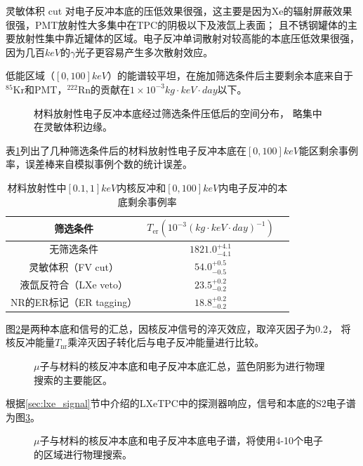 灵敏体积 cut 对电子反冲本底的压低效果很强，这主要是因为$\mathrm{Xe}$的辐射屏蔽效果很强，PMT放射性大多集中在TPC的阴极以下及液氙上表面；
且不锈钢罐体的主要放射性集中靠近罐体的区域。电子反冲单词散射对较高能的本底压低效果很强，因为几百$\si{keV}$的$\gamma$光子更容易产生多次散射效应。

低能区域（$[0, 100]\si{keV}$）的能谱较平坦，在施加筛选条件后主要剩余本底来自于${}^{85}\mathrm{Kr}$和PMT，${}^{222}\mathrm{Rn}$的贡献在$1\times10^{-3}\si{kg}\cdot\si{keV}\cdot\si{day}$以下。

\begin{figure}
  \centering
  
  \caption{\label{fig:material_er_xyzr} 材料放射性电子反冲本底经过筛选条件压低后的空间分布，
  略集中在灵敏体积边缘。}
\end{figure}

表\ref{tab:cuts_material_remain}列出了几种筛选条件后的材料放射性电子反冲本底在$[0,100]\si{keV}$能区剩余事例率，误差棒来自模拟事例个数的统计误差。

\begin{table}
  \centering
  \caption{材料放射性中$[0.1,1]\si{keV}$内核反冲和$[0,100]\si{keV}$内电子反冲的本底剩余事例率}
  \begin{tabular}{ccc}
    \toprule
    筛选条件 & $T_\mathrm{er}\left(10^{-3}\left(\si{kg}\cdot\si{keV}\cdot\si{day}\right)^{-1}\right)$ \\
    \midrule
    无筛选条件 & $1821.0_{-4.1}^{+4.1}$ \\
    灵敏体积（FV cut） & $54.0_{-0.5}^{+0.5}$ \\
    液氙反符合（LXe veto） & $23.5_{-0.2}^{+0.2}$ \\
    NR的ER标记（ER tagging） & $18.8_{-0.2}^{+0.2}$ \\
    \bottomrule
  \end{tabular}
  \label{tab:cuts_material_remain}
\end{table}

图\ref{fig:all_event_rate}是两种本底和信号的汇总，因核反冲信号的淬灭效应，取淬灭因子为0.2，
将核反冲能量$T_\mathrm{nr}$乘淬灭因子转化后与电子反冲能量进行比较。

\begin{figure}
  \centering
  
  \caption{\label{fig:all_event_rate} $\mu$子与材料的核反冲本底和电子反冲本底汇总，蓝色阴影为进行物理搜索的主要能区。}
\end{figure}

根据\ref{sec:lxe_signal}节中介绍的LXeTPC中的探测器响应，信号和本底的$\mathrm{S2}$电子谱为图\ref{fig:S2e_rate_bkg}。

\begin{figure}
  \centering
  
  \caption{\label{fig:S2e_rate_bkg} $\mu$子与材料的核反冲本底和电子反冲本底电子谱，将使用4-10个电子的区域进行物理搜索。}
\end{figure}
